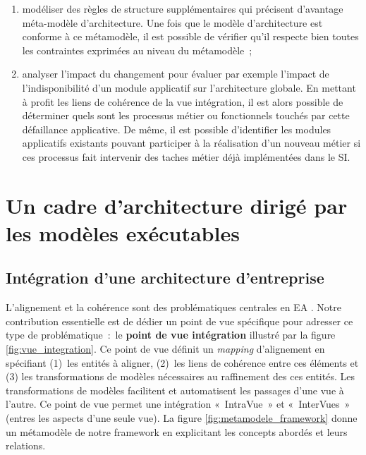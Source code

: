 \begin{enumerate}
    \item modéliser des règles de structure supplémentaires qui précisent d'avantage méta-modèle d'architecture. Une fois
que le modèle d'architecture est conforme à ce métamodèle, il est possible de
vérifier qu'il respecte bien toutes les contraintes exprimées au niveau du
métamodèle~;
    \item analyser l'impact du changement pour évaluer par exemple
l'impact de l'indisponibilité d'un module applicatif sur l'architecture
globale. En mettant à profit les liens de cohérence de la vue intégration, il
est alors possible de déterminer quels sont les processus métier ou
fonctionnels touchés par cette défaillance applicative. De même, il est
possible d'identifier les modules applicatifs existants pouvant participer à la
réalisation d'un nouveau métier si ces processus fait intervenir des taches
métier déjà implémentées dans le SI.
    \end{enumerate}

















\section{Un cadre d'architecture dirigé par les modèles exécutables}



\subsection{Intégration d'une architecture d'entreprise}

L'alignement et la cohérence sont des problématiques centrales en EA
\cite{kaisler_enterprise_2005}. Notre contribution essentielle est de dédier un
point de vue spécifique pour adresser ce type de problématique~:~le
\textbf{point de vue intégration} illustré par la figure
\ref{fig:vue_integration}. Ce point de vue définit un \textit{mapping}
d'alignement en spécifiant (1)~les entités à aligner, (2)~les liens de cohérence
entre ces éléments et (3) les transformations de modèles nécessaires au
raffinement des ces entités. Les transformations de modèles facilitent et
automatisent les passages d'une vue à l'autre. Ce point de vue permet une
intégration «~IntraVue~» et «~InterVues~» (entres les aspects d'une seule vue).
La figure \ref{fig:metamodele_framework} donne un métamodèle de notre framework
en explicitant les concepts abordés et leurs relations.

